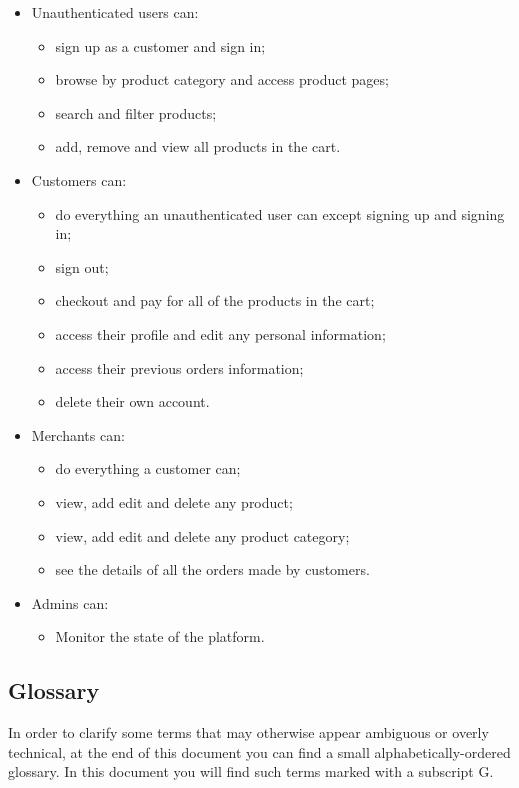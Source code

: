 \begin{itemize}
\item Unauthenticated users can:
\begin{itemize}
\item sign up as a customer and sign in;
\item browse by product category and access product pages;
\item search and filter products;
\item add, remove and view all products in the cart.
\end{itemize}
\item Customers can:
\begin{itemize}
\item do everything an unauthenticated user can except signing up and signing in;
\item sign out;
\item checkout and pay for all of the products in the cart;
\item access their profile and edit any personal information;
\item access their previous orders information;
\item delete their own account.
\end{itemize}
\item Merchants can:
\begin{itemize}
\item do everything a customer can;
\item view, add edit and delete any product;
\item view, add edit and delete any product category;
\item see the details of all the orders made by customers.
\end{itemize}
\item Admins can:
\begin{itemize}
\item Monitor the state of the platform.
\end{itemize}
\end{itemize}
\subsection{Glossary}
In order to clarify some terms that may otherwise appear ambiguous or overly technical, at the end of this document you can find a small alphabetically-ordered glossary. In this document you will find such terms marked with a subscript G.
